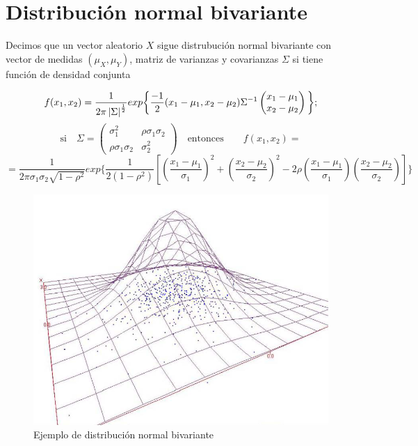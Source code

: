 \documentclass{article}
\begin{document}
\section{Distribución normal bivariante}


Decimos que un vector aleatorio $X$ sigue distrubución normal bivariante con vector de medidas $(\mu_X, \mu_Y)$, matriz de varianzas y covarianzas $\Sigma$
si tiene función de densidad conjunta

\[ f(x_1,x_2)=\frac{1}{2\pi\left| \Sigma \right|^{\frac{1}{2}}}exp\bigg{\{} \frac{-1}{2}(x_1 - \mu_1, x_2 - \mu_2)\Sigma^{-1}
\left(\begin{matrix}
    x_1 - \mu_1 \\
    x_2 - \mu_2
\end{matrix}\right) \bigg{\}}; \]
\[ \text{si}\quad \Sigma = \left( \begin{matrix}
    \sigma_1^2 & \rho\sigma_1\sigma_2 \\
    \rho\sigma_1\sigma_2 & \sigma_2^2
\end{matrix} \right) \quad \text{entonces} \qquad f(x_1,x_2)= \]
\[ = \frac{1}{2\pi\sigma_1\sigma_2\sqrt{1 - \rho^2}}exp\Biggl\{\frac{1}{2(1-\rho^2)}\left[ \left( \frac{x_1-\mu_1}{\sigma_1} \right)^2 + \left( \frac{x_2 - \mu_2}{\sigma_2} \right)^2 - 2\rho\left( \frac{x_1 - \mu_1}{\sigma_1} \right) \left( \frac{x_2 - \mu_2}{\sigma_2} \right) \right] \Biggr\} \]

\begin{figure}[htbp]
    \center
    \includegraphics[scale=0.6]{img/NormalBivariante.png}
    \caption{Ejemplo de distribución normal bivariante}
\end{figure}
\end{document}
